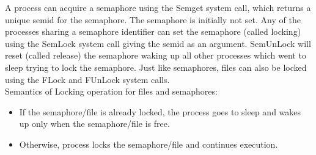 A process can acquire a semaphore using the Semget system call, which returns a unique semid for the semaphore. The semaphore is initially not set. Any of the processes sharing a semaphore identifier can set the semaphore (called locking) using the SemLock system call giving the semid as an argument. SemUnLock will reset (called release) the semaphore waking up all other processes which went to sleep trying to lock the semaphore. Just like semaphores, files can also be locked using the FLock and FUnLock system calls. 
\\ 
Semantics of Locking operation for files and semaphores:
\begin{itemize}

\item If the semaphore/file is already locked, the process goes to sleep and wakes up only when the semaphore/file is free.
\item Otherwise, process locks the semaphore/file and continues execution.

\end{itemize}
